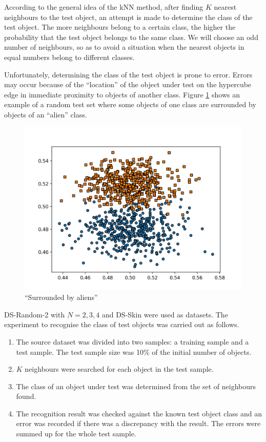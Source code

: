 \documentclass[entropy,article,submit,moreauthors,pdftex]{Definitions/mdpi}
\begin{document}
\begin{paracol}{2}
According to the general idea of the kNN method, after finding $K$ nearest neighbours to the test object, an attempt is made to determine the class of the test object. The more neighbours belong to a certain class, the higher the probability that the test object belongs to the same class. We will choose an odd number of neighbours, so as to avoid a situation when the nearest objects in equal numbers belong to different classes.

Unfortunately, determining the class of the test object is prone to error. Errors may occur because of the ``location'' of the object under test on the hypercube edge in immediate proximity to objects of another class. Figure \ref{fig7} shows an example of a random test set where some objects of one class are surrounded by objects of an ``alien'' class.

\begin{figure}[h]
\widefigure
\includegraphics[width=0.7\linewidth]{fig7.png}
\caption{``Surrounded by aliens''\label{fig7}}
\end{figure}

DS-Random-2 with $N = 2, 3, 4$ and DS-Skin were used as datasets. The experiment to recognise the class of test objects was carried out as follows.

\begin{enumerate}
\item The source dataset was divided into two samples: a training sample and a test sample. The test sample size was 10\% of the initial number of objects.
\item $K$ neighbours were searched for each object in the test sample.
\item The class of an object under test was determined from the set of neighbours found.
\item The recognition result was checked against the known test object class and an error was recorded if there was a discrepancy with the result. The errors were summed up for the whole test sample.
\end{enumerate}


\end{paracol}
\end{document}
